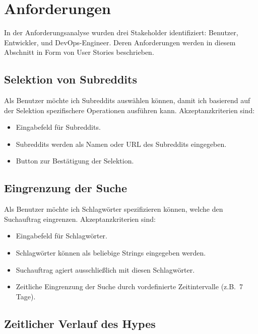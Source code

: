 \documentclass[a4paper, 10pt, conference]{ieeeconf}
\begin{document}
\section{Anforderungen} \label{s:anforderungen}

In der Anforderungsanalyse wurden drei Stakeholder identifiziert: Benutzer, Entwickler, und DevOps-Engineer. Deren Anforderungen werden in diesem Abschnitt in Form von User Stories beschrieben.

\subsection{Selektion von Subreddits}

Als Benutzer möchte ich Subreddits auswählen können, damit ich basierend auf der Selektion spezifischere Operationen ausführen kann. Akzeptanzkriterien sind:
\begin{itemize}
\item Eingabefeld für Subreddits.
\item Subreddits werden als Namen oder URL des Subreddits eingegeben.
\item Button zur Bestätigung der Selektion.
\end{itemize}

\subsection{Eingrenzung der Suche}

Als Benutzer möchte ich Schlagwörter spezifizieren können, welche den Suchauftrag eingrenzen. Akzeptanzkriterien sind:
\begin{itemize}
\item Eingabefeld für Schlagwörter.
\item Schlagwörter können als beliebige Strings eingegeben werden.
\item Suchauftrag agiert ausschließlich mit diesen Schlagwörter.
\item Zeitliche Eingrenzung der Suche durch vordefinierte Zeitintervalle (z.B.~7 Tage).
\end{itemize}

\subsection{Zeitlicher Verlauf des Hypes}
\end{document}

